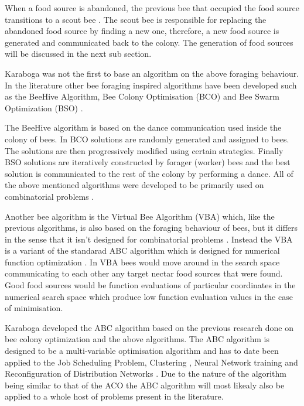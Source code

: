 When a food source is abandoned, the previous bee that occupied the food source transitions to a scout bee \cite{ABCCompareStudy,ABCNumericalOptimization}. The scout bee is responsible for replacing the abandoned food source by finding a new one, therefore, a new food source is generated and communicated back to the colony\cite{ABCCompareStudy,ABCImageEnhancement,ABCNumericalOptimization}. The generation of food sources will be discussed in the next sub section.

Karaboga was not the first to base an algorithm on the above foraging behaviour. In the literature other bee foraging inspired algorithms have been developed such as the BeeHive Algorithm, Bee Colony Optimisation (BCO) and Bee Swarm Optimization (BSO) \cite{BCO,HybridABCClustering,ABCNumericalOptimization}. 

The BeeHive algorithm is based on the dance communication used inside the colony of bees. In BCO solutions are randomly generated and assigned to bees\cite{HybridABCClustering,ABCNumericalOptimization}. The solutions are then progressively modified using certain strategies. Finally BSO solutions are iteratively constructed by forager (worker) bees and the best solution is communicated to the rest of the colony by performing a dance\cite{HybridABCClustering,ABCNumericalOptimization}. All of the above mentioned algorithms were developed to be primarily used on combinatorial problems \cite{ABCCompareStudy}.

Another bee algorithm is the Virtual Bee Algorithm (VBA) which, like the previous algorithms, is also based on the foraging behaviour of bees, but it differs in the sense that it isn't designed for combinatorial problems \cite{ABCNumericalOptimization}. Instead the VBA is a variant of the standarad ABC algorithm which is designed for numerical function optimization \cite{ABCNumericalOptimization}. In VBA bees would move around in the search space communicating to each other any target nectar food sources that were found\cite{ABCNumericalOptimization}. Good food sources would be function evaluations of particular coordinates in the numerical search space which produce low function evaluation values in the case of minimisation\cite{ABCNumericalOptimization}.

Karaboga developed the ABC algorithm based on the previous research done on bee colony optimization and the above algorithms. The ABC algorithm is designed to be a multi-variable optimisation algorithm and has to date been applied to the Job Scheduling Problem, Clustering \cite{HybridABCClustering}, Neural Network training and Reconfiguration of Distribution Networks \cite{ABCReconfigDistro}. Due to the nature of the algorithm being similar to that of the ACO the ABC algorithm will most likealy also be applied to a whole host of problems present in the literature.

